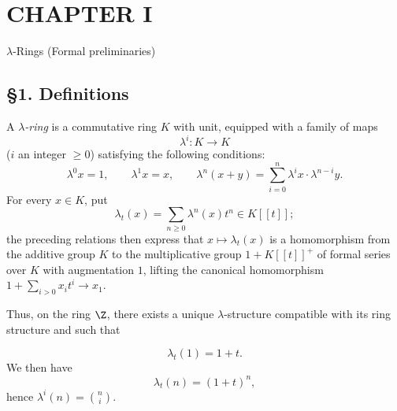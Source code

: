 \clearpage

\section*{CHAPTER I}
\begin{center}
$\lambda$-Rings (Formal preliminaries)
\end{center}

\subsection*{\S 1. Definitions}

A \emph{$\lambda$-ring} is a commutative ring $K$ with unit, equipped with a family of maps
\begin{equation}\tag{1.1}
\lambda^i:K\longrightarrow K
\end{equation}
($i$ an integer $\geq 0$) satisfying the following conditions:
\begin{equation}\tag{1.2}
\lambda^0x=1,\qquad \lambda^1x=x,\qquad
\lambda^n(x+y)=\sum_{i=0}^n\lambda^ix\cdot\lambda^{n-i}y.
\end{equation}
For every $x\in K$, put
\begin{equation}\tag{1.3}
\lambda_t(x)=\sum_{n\geq 0}\lambda^n(x)t^n\in K[[t]] ;
\end{equation}
the preceding relations then express that $x\longmapsto\lambda_t(x)$ is a homomorphism from the additive group $K$ to the multiplicative group $1+K[[t]]^+$ of formal series over $K$ with augmentation $1$, lifting the canonical homomorphism $1+\sum_{i>0}x_it^i\longrightarrow x_1$.

Thus, on the ring $\Z$, there exists a unique $\lambda$-structure compatible with its ring structure and such that

\begin{equation}\tag{1.4}
\lambda_t(1)=1+t.
\end{equation}
We then have
\begin{equation}\tag{1.5}
\lambda_t(n)=(1+t)^n,
\end{equation}
hence $\lambda^i(n)=\binom{n}{i}$.

